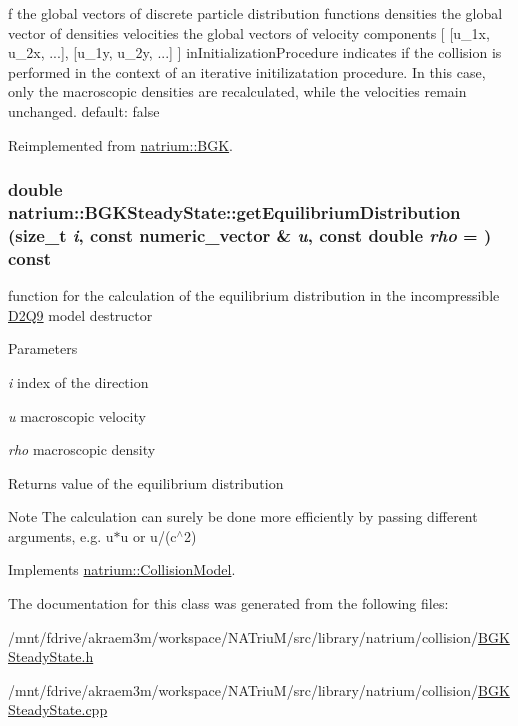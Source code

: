 f the global vectors of discrete particle distribution functions densities the global vector of densities velocities the global vectors of velocity components \mbox{[} \mbox{[}u\_\-1x, u\_\-2x, ...\mbox{]}, \mbox{[}u\_\-1y, u\_\-2y, ...\mbox{]} \mbox{]} inInitializationProcedure indicates if the collision is performed in the context of an iterative initilizatation procedure. In this case, only the macroscopic densities are recalculated, while the velocities remain unchanged. default: false 

Reimplemented from \hyperlink{classnatrium_1_1BGK_ae5e97a4995fe927e9042a6cffac80acc}{natrium::BGK}.\hypertarget{classnatrium_1_1BGKSteadyState_ad99d9159cc14b5897bea7f145c3b39ca}{
\subsubsection[{getEquilibriumDistribution}]{\setlength{\rightskip}{0pt plus 5cm}double natrium::BGKSteadyState::getEquilibriumDistribution (size\_\-t {\em i}, \/  const numeric\_\-vector \& {\em u}, \/  const double {\em rho} = {}) const}}
\label{classnatrium_1_1BGKSteadyState_ad99d9159cc14b5897bea7f145c3b39ca}


function for the calculation of the equilibrium distribution in the incompressible \hyperlink{classnatrium_1_1D2Q9}{D2Q9} model destructor


\begin{DoxyParams}{Parameters}
\item[{\em i}]index of the direction \item[{\em u}]macroscopic velocity \item[{\em rho}]macroscopic density \end{DoxyParams}
\begin{DoxyReturn}{Returns}
value of the equilibrium distribution 
\end{DoxyReturn}
\begin{DoxyNote}{Note}
The calculation can surely be done more efficiently by passing different arguments, e.g. u$\ast$u or u/(c$^\wedge$2) 
\end{DoxyNote}


Implements \hyperlink{classnatrium_1_1CollisionModel_a88b382d63da80e950bc58e8afad769a6}{natrium::CollisionModel}.

The documentation for this class was generated from the following files:\begin{DoxyCompactItemize}
\item 
/mnt/fdrive/akraem3m/workspace/NATriuM/src/library/natrium/collision/\hyperlink{BGKSteadyState_8h}{BGKSteadyState.h}\item 
/mnt/fdrive/akraem3m/workspace/NATriuM/src/library/natrium/collision/\hyperlink{BGKSteadyState_8cpp}{BGKSteadyState.cpp}\end{DoxyCompactItemize}
